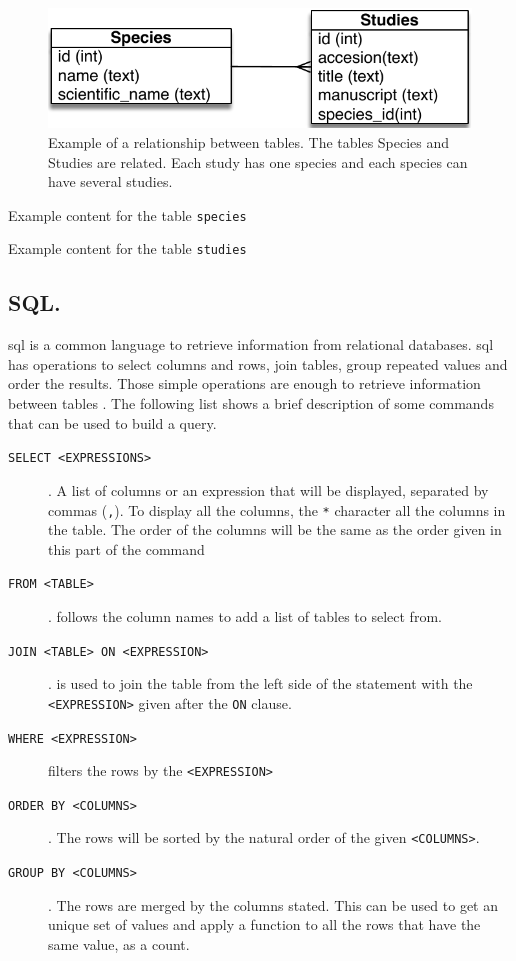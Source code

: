 \begin{figure}
\includegraphics{expVIP/Figures/miniER.pdf}
\caption[Example of a relationship between tables.]{Example of a relationship between tables. The tables Species and Studies are related. Each study has one species and each species can have several studies.}
\label{fig:expvip:miniER}
\end{figure}

\begin{table}
\caption[Species]{Example content for the table \texttt{species}}
\label{exp:tab:species}
\centering

\end{table}

\begin{table}
\caption[Studies]{Example content for the table \texttt{studies}}
\label{exp:tab:studies}
\centering

\end{table}

\subsection{SQL.}
\gls{sql} is a common language to retrieve information from relational databases. 
\acrshort{sql} has operations to select columns and rows, join tables, group repeated values and order the results. 
Those simple operations are enough to retrieve information between tables \citep{Oracle2014}. 
The following list shows a brief description of some commands  that can be used to build a query.  

\begin{description}
\item[\texttt{SELECT <EXPRESSIONS> }]. A list of columns or an expression that will be displayed, separated by commas (\texttt{,}). To display all the columns, the \texttt{*} character  all the columns in the table. The order of the columns will be the same as the order given in this part of the command
\item[\texttt{FROM <TABLE>}]. follows the column names to add a list of tables to select from.
\item[\texttt{JOIN <TABLE> ON <EXPRESSION> }]. is used to join the table from the left side of the statement with the \texttt{<EXPRESSION>} given after the \texttt{ON} clause.  
\item[\texttt{WHERE <EXPRESSION>}] filters the rows by the \texttt{<EXPRESSION>}
\item[\texttt{ORDER BY <COLUMNS>}]. The rows will be sorted by the natural order of the given \texttt{<COLUMNS>}.  
\item[\texttt{GROUP BY <COLUMNS>}]. The rows are merged by the columns stated. This can be used to get an unique set of values and apply a function to all the rows that have the same value, as a count.
\end{description} 

